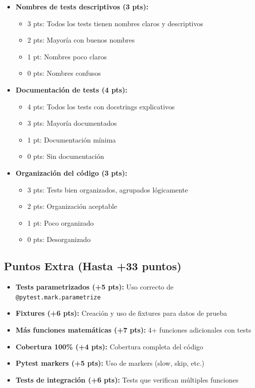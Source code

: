 \documentclass[12pt,a4paper]{article}
\begin{document}
\begin{itemize}[leftmargin=*]
    \item \textbf{Nombres de tests descriptivos (3 pts):}
    \begin{itemize}
        \item 3 pts: Todos los tests tienen nombres claros y descriptivos
        \item 2 pts: Mayoría con buenos nombres
        \item 1 pt: Nombres poco claros
        \item 0 pts: Nombres confusos
    \end{itemize}
    
    \item \textbf{Documentación de tests (4 pts):}
    \begin{itemize}
        \item 4 pts: Todos los tests con docstrings explicativos
        \item 3 pts: Mayoría documentados
        \item 1 pt: Documentación mínima
        \item 0 pts: Sin documentación
    \end{itemize}
    
    \item \textbf{Organización del código (3 pts):}
    \begin{itemize}
        \item 3 pts: Tests bien organizados, agrupados lógicamente
        \item 2 pts: Organización aceptable
        \item 1 pt: Poco organizado
        \item 0 pts: Desorganizado
    \end{itemize}
\end{itemize}

\subsection{Puntos Extra (Hasta +33 puntos)}

\begin{itemize}[leftmargin=*]
    \item \textbf{Tests parametrizados (+5 pts):} Uso correcto de \texttt{@pytest.mark.parametrize}
    \item \textbf{Fixtures (+6 pts):} Creación y uso de fixtures para datos de prueba
    \item \textbf{Más funciones matemáticas (+7 pts):} 4+ funciones adicionales con tests
    \item \textbf{Cobertura 100\% (+4 pts):} Cobertura completa del código
    \item \textbf{Pytest markers (+5 pts):} Uso de markers (slow, skip, etc.)
    \item \textbf{Tests de integración (+6 pts):} Tests que verifican múltiples funciones
\end{itemize}
\end{document}
